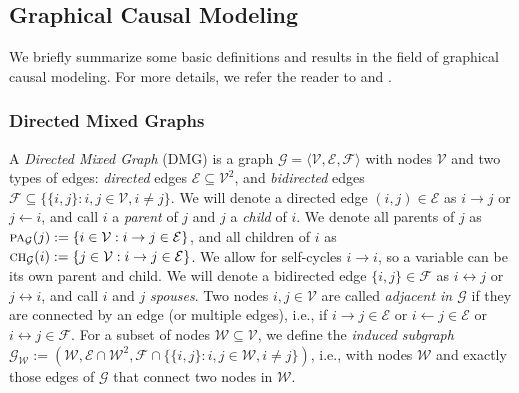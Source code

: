 \documentclass[twoside,11pt]{article}
\newcommand\C[1]{\mathcal{#1}}
\newcommand\mathbfsc[1]{\text{\normalfont\scshape#1}}
\newcommand\pasub[2]{\mathbfsc{pa}_{#1}(#2)}
\newcommand\chsub[2]{\mathbfsc{ch}_{#1}(#2)}
\newcommand{\ot}{\leftarrow}
\newcommand{\oto}{\leftrightarrow}
\newcommand{\Joris}[1]{{\color{blue}#1}}
\newcommand{\Sara}[1]{{\color{purple}#1}}
\begin{document}
\subsection{Graphical Causal Modeling}\label{sec:graphical_causal_modeling}


We briefly summarize some basic definitions and results in the field of graphical causal modeling.
For more details, we refer the reader to \citet{Pearl2009} and \citet{Bongers++_1611.06221v2}.

\subsubsection{Directed Mixed Graphs}
A \emph{Directed Mixed Graph} (DMG) is a graph $\C{G} = \langle \C{V},\C{E},\C{F} \rangle$ with 
nodes $\C{V}$ and two types of edges: \emph{directed} edges $\C{E} \subseteq \C{V}^2$, and 
\emph{bidirected} edges $\C{F} \subseteq \{\{i,j\} : i, j \in \C{V}, i \ne j\}$. 
We will denote a directed edge $(i,j) \in \C{E}$ as $i \rightarrow j$ or $j \ot i$, and
call $i$ a \emph{parent} of $j$ and $j$ a \emph{child} of $i$. We denote all parents of
$j$ as $\pasub{\C{G}}{j} := \{i \in \C{V} : i \to j \in \C{E}\}$, and all children of $i$ as
$\chsub{\C{G}}{i} := \{j \in \C{V} : i \to j \in \C{E}\}$. We allow for self-cycles $i \to i$,
so a variable can be its own parent and child.
We will denote a bidirected edge $\{i,j\} \in \C{F}$ as $i \oto j$ or $j \oto i$,
and call $i$ and $j$ \emph{spouses}.
Two nodes $i,j \in \C{V}$ are called \emph{adjacent in $\C{G}$} if they are connected by an edge (or multiple edges), i.e., 
if $i\to j \in \C{E}$ or $i \ot j \in \C{E}$ or $i \oto j \in \C{F}$.
For a subset of nodes $\C{W} \subseteq \C{V}$, we define the \emph{induced subgraph} $\C{G}_{\C{W}}
:= (\C{W},\C{E}\cap \C{W}^2,\C{F}\cap \{\{i,j\} : i,j \in \C{W}, i \ne j\})$, i.e., 
with nodes $\C{W}$ and exactly those edges of $\C{G}$ that connect two nodes in $\C{W}$.
\end{document}
